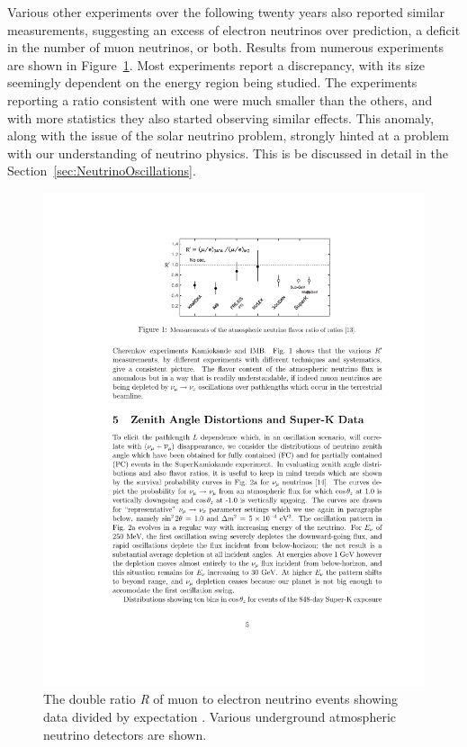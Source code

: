 Various other experiments over the following twenty years also reported similar measurements, suggesting an excess of electron neutrinos over prediction, a deficit in the number of muon neutrinos, or both.  Results from numerous experiments are shown in Figure~\ref{fig:AtmosphericNeutrinoAnomaly}.  Most experiments report a discrepancy, with its size seemingly dependent on the energy region being studied.  The experiments reporting a ratio consistent with one were much smaller than the others, and with more statistics they also started observing similar effects.  This anomaly, along with the issue of the solar neutrino problem, strongly hinted at a problem with our understanding of neutrino physics.  This is be discussed in detail in the Section~\ref{sec:NeutrinoOscillations}.

\begin{figure}
  \centering
  \includegraphics[width=12cm]{AtmosphericNeutrinoAnomaly.pdf}
  \caption{The double ratio \textit{R} of muon to electron neutrino events showing data divided by expectation \cite{Mann1999}.  Various underground atmospheric neutrino detectors are shown.}
  \label{fig:AtmosphericNeutrinoAnomaly}
\end{figure}

